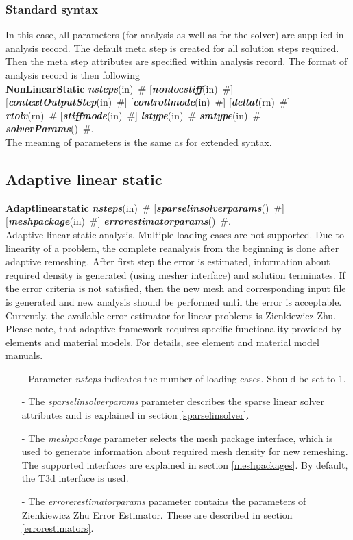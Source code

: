 \documentclass[draft]{article}
\newcommand{\param}[1]{{\em #1}}
\newcommand{\keywordnotype}[1]{\mbox{{\it{\bf{#1}}}}}
\newcommand{\keyword}[2]{\mbox{{\keywordnotype{#1}\tiny (#2)}}}
\newcommand{\entKeywordInst}[1]{\mbox{{\bf{{#1}}}}}
\newcommand{\field}[2]{\mbox{\keyword{#1}{#2}~\#}}
\newcommand{\optField}[2]{\mbox{[\field{#1}{#2}]}}
\begin{document}
\subsubsection{Standard syntax}
In this case, all parameters (for analysis as well as for the solver)
are supplied in analysis record. The default meta step is created for
all solution steps required. Then the meta step attributes are
specified within analysis record. The format of analysis record is
then following\\
\entKeywordInst{NonLinearStatic} \field{nsteps}{in}
\optField{nonlocstiff}{in}\\
 \optField{contextOutputStep}{in} \optField{controllmode}{in} \optField{deltat}{rn}\\
\field{rtolv}{rn} \optField{stiffmode}{in} \field{lstype}{in}
\field{smtype}{in} \field{solverParams}{}.\\ The
meaning of parameters is the same as for extended syntax.

%
\subsection{Adaptive linear static}
\label{AdaptiveLinearStatic}
\entKeywordInst{Adaptlinearstatic} \field{nsteps}{in}
\optField{sparselinsolverparams}{} \\\optField{meshpackage}{in} \field{errorestimatorparams}{}.\\
Adaptive linear static analysis. Multiple loading cases are not
supported. Due to linearity of a problem, the complete reanalysis from
the beginning is done after adaptive remeshing.
After first step the error is estimated, information about required density is generated
(using mesher interface) and solution terminates. If the error
criteria is not satisfied, then the new mesh
and corresponding input file is generated and new analysis should be
performed until the error is acceptable.
Currently, the available error estimator for linear problems is
Zienkiewicz-Zhu. Please note, that adaptive framework requires
specific functionality provided by elements and material models. For
details, see element and material model manuals.
\begin{itemize}
\item[-]
Parameter \param{nsteps} indicates the number of loading cases.
Should be set to 1.
\item[-]
The  \param{sparselinsolverparams} parameter describes the sparse
linear solver attributes and is explained in section \ref{sparselinsolver}.
\item[-]
The \param{meshpackage} parameter selects the mesh package interface,
which is used to generate information about required mesh density for
new remeshing. The supported interfaces are explained in section
\ref{meshpackages}. By default, the T3d interface is used.
\item[-]
The \param{errorerestimatorparams} parameter contains the parameters
of Zien\-kie\-wicz Zhu Error Estimator. These are described in section \ref{errorestimators}.
\end{itemize}
\end{document}
